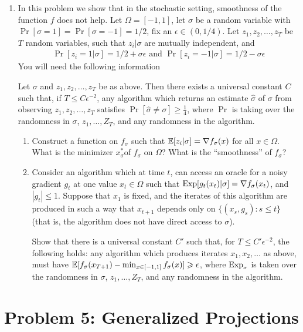 \documentclass[12pt]{article}
\begin{document}
\begin{enumerate}
\item 
In this problem we show that in the stochastic setting, smoothness of the function $f$ does not help. Let $\Omega = [-1,1]$, let $\sigma$ be a random variable with $\Pr[\sigma = 1] = \Pr[\sigma = -1] = 1/2$, fix an $\epsilon \in (0,1/4)$. Let $z_1,z_2,\dots,z_T$ be $T$ random variables, such that $z_i | \sigma$ are mutually independent, and 
\begin{eqnarray}
\Pr[z_i =  1 | \sigma] = 1/2 + \sigma \epsilon \text{ and } \Pr[z_i =  -1 | \sigma] = 1/2 - \sigma \epsilon 
\end{eqnarray}
You will need the following information
\begin{lemma*} Let $\sigma$ and $z_1,z_2,\dots,z_T$ be as above. Then there exists a universal constant $C$ such that, if $T \le C \epsilon^{-2}$, any algorithm which returns an estimate $\widehat{\sigma}$ of $\sigma$ from observing $z_1,z_2,\dots,z_T$ satisfies $\Pr[\widehat{\sigma} \ne \sigma] \ge \frac{1}{4}$, where $\Pr$ is taking over the randomness in $\sigma$, $z_1,\dots,Z_T$, and any randomness in the algorithm. 
\end{lemma*}
\begin{enumerate}
\item
Construct a function on $f_{\sigma}$ such that $\operatorname*{\mathbb{E}}[z_i | \sigma] = \nabla f_{\sigma}(x)$ for all $x \in \Omega$. What is the minimizer $x^*_{\sigma} $of $f_{\sigma}$ on $\Omega$? What is the ``smoothness'' of $f_{\sigma}$?
\item 
Consider an algorithm which at time $t$, can access an oracle for a noisy gradient $g_t$ at one value $x_t \in \Omega$ such that $\mathrm{Exp}[g_t(x_t) | \sigma] = \nabla f_\sigma(x_t)$, and $|g_t| \le 1$. Suppose that $x_1$ is fixed, and the iterates of this algorithm are produced in such a way that $x_{t+1}$ depends only on $\{(x_s,g_s):s \le t\}$ (that is, the algorithm does not have direct access to $\sigma$). 

Show that there is a universal constant $C'$ such that, for $T \le C'\epsilon^{-2}$, the following holds: any algorithm which produces iterates $x_1,x_2,\dots$ as above, must have $\operatorname*{\mathbb{E}}[f_{\sigma}(x_{T+1}) - \min_{x \in [-1,1]}f_{\sigma}(x)] \geqslant \epsilon$, where $\mathrm{Exp}_{\sigma}$ is taken over the randomness in $\sigma$, $z_1,\dots,Z_T$, and any randomness in the algorithm.  
\end{enumerate}
\end{enumerate}
\section*{Problem 5: Generalized Projections}
\end{document}
